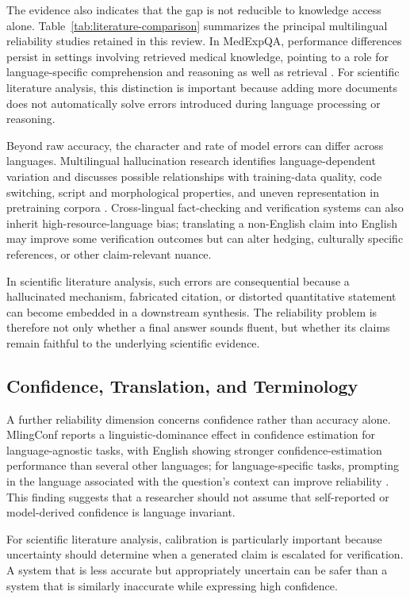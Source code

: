 \documentclass[acmsmall,nonacm]{acmart}
\begin{document}
The evidence also indicates that the gap is not reducible to knowledge access alone. Table~\ref{tab:literature-comparison} summarizes the principal multilingual reliability studies retained in this review. In MedExpQA, performance differences persist in settings involving retrieved medical knowledge, pointing to a role for language-specific comprehension and reasoning as well as retrieval \cite{GarcíaFerrero2024}. For scientific literature analysis, this distinction is important because adding more documents does not automatically solve errors introduced during language processing or reasoning.

Beyond raw accuracy, the character and rate of model errors can differ across languages. Multilingual hallucination research identifies language-dependent variation and discusses possible relationships with training-data quality, code switching, script and morphological properties, and uneven representation in pretraining corpora \cite{Huang2025}. Cross-lingual fact-checking and verification systems can also inherit high-resource-language bias; translating a non-English claim into English may improve some verification outcomes but can alter hedging, culturally specific references, or other claim-relevant nuance.

In scientific literature analysis, such errors are consequential because a hallucinated mechanism, fabricated citation, or distorted quantitative statement can become embedded in a downstream synthesis. The reliability problem is therefore not only whether a final answer sounds fluent, but whether its claims remain faithful to the underlying scientific evidence.

\subsection{Confidence, Translation, and Terminology}
A further reliability dimension concerns confidence rather than accuracy alone. MlingConf reports a linguistic-dominance effect in confidence estimation for language-agnostic tasks, with English showing stronger confidence-estimation performance than several other languages; for language-specific tasks, prompting in the language associated with the question's context can improve reliability \cite{Xue2024}. This finding suggests that a researcher should not assume that self-reported or model-derived confidence is language invariant.

For scientific literature analysis, calibration is particularly important because uncertainty should determine when a generated claim is escalated for verification. A system that is less accurate but appropriately uncertain can be safer than a system that is similarly inaccurate while expressing high confidence.
\end{document}
